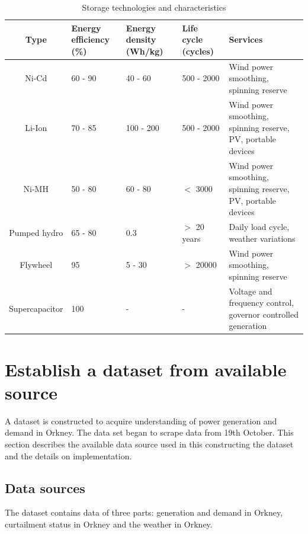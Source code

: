 \documentclass[12pt,a4paper]{report}
\begin{document}
        \begin{table}[ht]
            \begin{tabulary}{\linewidth}{c L L L L}
                \hline
                Type & Energy efficiency (\%) & Energy density (Wh/kg) & Life cycle (cycles) & Services \\ \hline
                \hline
                Ni-Cd & 60 - 90 & 40 - 60 & 500 - 2000 & Wind power smoothing, spinning reserve \\ \hline
                Li-Ion & 70 - 85 & 100 - 200 & 500 - 2000 &  Wind power smoothing, spinning reserve, PV, portable devices\\ \hline
                Ni-MH & 50 - 80 & 60 - 80 & $<$ 3000 & Wind power smoothing, spinning reserve, PV, portable devices \\ \hline
                Pumped hydro & 65 - 80 & 0.3 & $>$ 20 years & Daily load cycle, weather variations \\ \hline
                Flywheel & 95 & 5 - 30 & $>$ 20000 &  Wind power smoothing, spinning reserve \\ \hline
                Supercapacitor & 100 & - & - & Voltage and frequency control, governor controlled generation \\ \hline
            \end{tabulary}
            \caption{Storage technologies and characteristics}
            \label{table_storage_characteristics}
        \end{table}

        \section{Establish a dataset from available source}
        A dataset is constructed to acquire understanding of power generation and demand in Orkney. The data set began to scrape data from 19th October. 
        This section describes the available data source used in this constructing the dataset and the details on implementation.

        \subsection{Data sources}
        The dataset contains data of three parts: generation and demand in Orkney, curtailment status in Orkney and the weather in Orkney.
\end{document}
